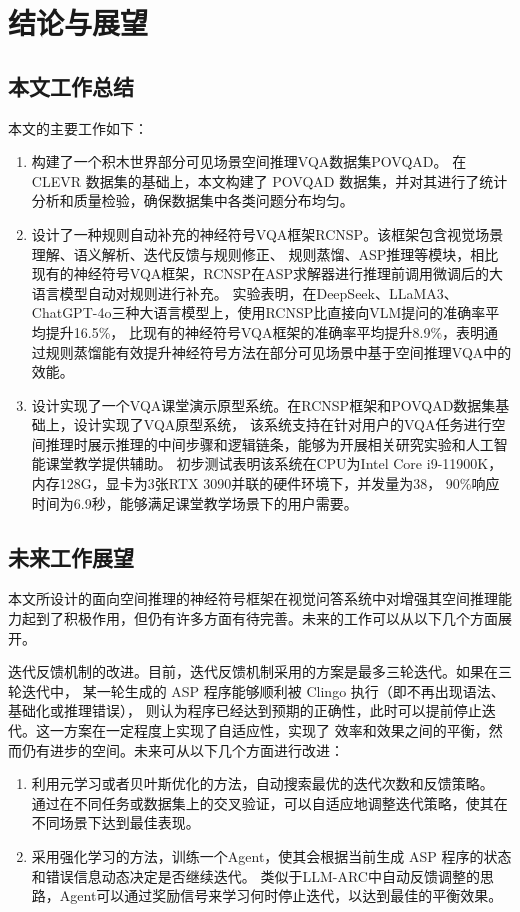 \chapter{结论与展望}
\section{本文工作总结}
本文的主要工作如下：
\begin{enumerate}[itemsep=0pt,parsep=0pt]
\item 构建了一个积木世界部分可见场景空间推理VQA数据集POVQAD。
在 CLEVR 数据集的基础上，本文构建了 POVQAD 数据集，并对其进行了统计分析和质量检验，确保数据集中各类问题分布均匀。
\item 设计了一种规则自动补充的神经符号VQA框架RCNSP。该框架包含视觉场景理解、语义解析、迭代反馈与规则修正、
规则蒸馏、ASP推理等模块，相比现有的神经符号VQA框架，RCNSP在ASP求解器进行推理前调用微调后的大语言模型自动对规则进行补充。
实验表明，在DeepSeek、LLaMA3、ChatGPT-4o三种大语言模型上，使用RCNSP比直接向VLM提问的准确率平均提升16.5\%，
比现有的神经符号VQA框架的准确率平均提升8.9\%，表明通过规则蒸馏能有效提升神经符号方法在部分可见场景中基于空间推理VQA中的效能。
\item 设计实现了一个VQA课堂演示原型系统。在RCNSP框架和POVQAD数据集基础上，设计实现了VQA原型系统，
该系统支持在针对用户的VQA任务进行空间推理时展示推理的中间步骤和逻辑链条，能够为开展相关研究实验和人工智能课堂教学提供辅助。
初步测试表明该系统在CPU为Intel Core i9-11900K，内存128G，显卡为3张RTX 3090并联的硬件环境下，并发量为38，
90\%响应时间为6.9秒，能够满足课堂教学场景下的用户需要。
\end{enumerate}
\section{未来工作展望}
本文所设计的面向空间推理的神经符号框架在视觉问答系统中对增强其空间推理能力起到了积极作用，但仍有许多方面有待完善。未来的工作可以从以下几个方面展开。

迭代反馈机制的改进。目前，迭代反馈机制采用的方案是最多三轮迭代。如果在三轮迭代中，
某一轮生成的 ASP 程序能够顺利被 Clingo 执行（即不再出现语法、基础化或推理错误），
则认为程序已经达到预期的正确性，此时可以提前停止迭代。这一方案在一定程度上实现了自适应性，实现了
效率和效果之间的平衡，然而仍有进步的空间。未来可从以下几个方面进行改进：
\begin{enumerate}[itemsep=0pt,parsep=0pt]
    \item 利用元学习或者贝叶斯优化的方法，自动搜索最优的迭代次数和反馈策略。
通过在不同任务或数据集上的交叉验证，可以自适应地调整迭代策略，使其在不同场景下达到最佳表现。
    \item 采用强化学习的方法，训练一个Agent，使其会根据当前生成 ASP 程序的状态和错误信息动态决定是否继续迭代。
类似于LLM-ARC中自动反馈调整的思路，Agent可以通过奖励信号来学习何时停止迭代，以达到最佳的平衡效果\cite{kalyanpur2024llmarcenhancingllmsautomated}。
\end{enumerate}

